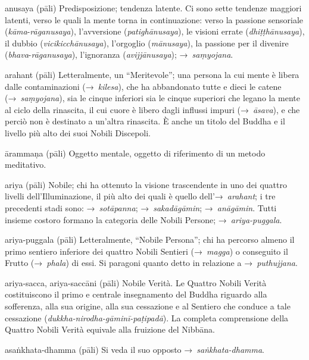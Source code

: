 \begin{glossarydescription}
\item[anusaya] (pāli) Predisposizione; tendenza latente. Ci sono sette tendenze
  maggiori latenti, verso le quali la mente torna in continuazione: verso la
  passione sensoriale (\emph{kāma}-\emph{rāganusaya}), l'avversione
  (\emph{patighānusaya}), le visioni errate (\emph{dhiṭṭhānusaya}), il dubbio
  (\emph{vicikicchānusaya}), l'orgoglio (\emph{mānusaya}), la passione per il
  divenire (\emph{bhava}-\emph{rāganusaya}), l'ignoranza (\emph{avijjānusaya});
  →~\emph{saṃyojana}.

\item[arahant] (pāli) Letteralmente, un ``Meritevole''; una
  persona la cui mente è libera dalle contaminazioni (→~\emph{kilesa}), che ha
  abbandonato tutte e dieci le catene (→~\emph{saṃyojana}), sia le cinque
  inferiori sia le cinque superiori che legano la mente al ciclo della
  rinascita, il cui cuore è libero dagli influssi impuri (→~\emph{āsava}), e che
  perciò non è destinato a un'altra rinascita. È anche un titolo del Buddha e il
  livello più alto dei suoi Nobili Discepoli.

\item[ārammaṇa] (pāli) Oggetto mentale, oggetto di riferimento di un metodo
  meditativo.

\item[ariya] (pāli) Nobile; chi ha ottenuto la visione trascendente in uno dei
  quattro livelli dell'Illuminazione, il più alto dei quali è quello
  dell'→~\emph{arahant}; i tre precedenti stadi sono: →~\emph{sotāpanna};
  →~\emph{sakadāgāmin}; →~\emph{anāgāmin}. Tutti insieme costoro formano la
  categoria delle Nobili Persone; →~\emph{ariya-puggala}.

\item[ariya-puggala] (pāli) Letteralmente, ``Nobile Persona''; chi ha percorso
  almeno il primo sentiero inferiore dei quattro Nobili Sentieri
  (→~\emph{magga}) o conseguito il Frutto (→~\emph{phala}) di essi. Si paragoni
  quanto detto in relazione a →~\emph{puthujjana}.

\item[ariya-sacca, ariya-saccāni] (pāli) Nobile Verità. Le Quattro Nobili Verità
  costituiscono il primo e centrale insegnamento del Buddha riguardo alla
  sofferenza, alla sua origine, alla sua cessazione e al Sentiero che conduce a
  tale cessazione (\emph{dukkha-nirodha-gāminī-paṭipadā}). La completa
  comprensione della Quattro Nobili Verità equivale alla fruizione del
  Nibbāna.

\item[asaṅkhata-dhamma] (pāli) Si veda il suo opposto →~\emph{saṅkhata-dhamma}.


\end{glossarydescription}
